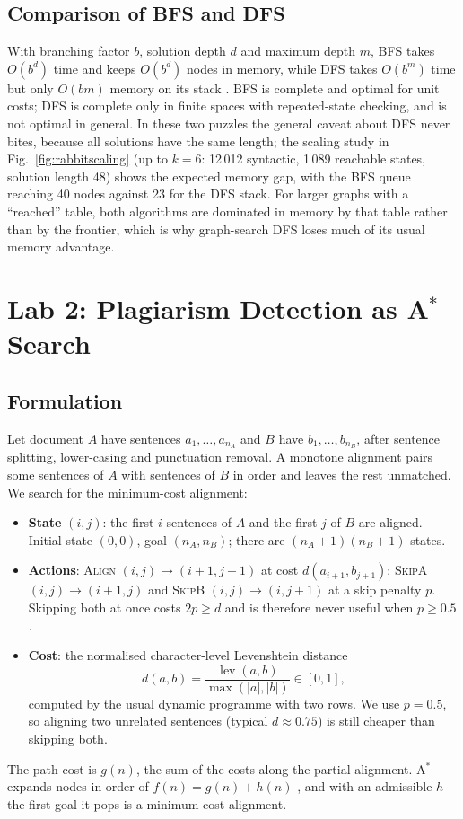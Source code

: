 \documentclass[journal]{IEEEtran}
\begin{document}
\subsection{Comparison of BFS and DFS}
With branching factor $b$, solution depth $d$ and maximum depth $m$, BFS takes
$O(b^d)$ time and keeps $O(b^d)$ nodes in memory, while DFS takes $O(b^m)$ time but only
$O(bm)$ memory on its stack \cite{aima4}. BFS is complete and optimal for unit costs; DFS
is complete only in finite spaces with repeated-state checking, and is not optimal in
general. In these two puzzles the general caveat about DFS never bites, because all
solutions have the same length; the scaling study in Fig.~\ref{fig:rabbitscaling} (up to
$k=6$: 12\,012 syntactic, 1\,089 reachable states, solution length 48) shows the expected
memory gap, with the BFS queue reaching 40 nodes against 23 for the DFS stack. For larger
graphs with a ``reached'' table, both algorithms are dominated in memory by that table
rather than by the frontier, which is why graph-search DFS loses much of its usual memory
advantage.

\section{Lab 2: Plagiarism Detection as A$^*$ Search}
\subsection{Formulation}
Let document $A$ have sentences $a_1,\dots,a_{n_A}$ and $B$ have $b_1,\dots,b_{n_B}$, after
sentence splitting, lower-casing and punctuation removal. A monotone alignment pairs some
sentences of $A$ with sentences of $B$ in order and leaves the rest unmatched. We search for
the minimum-cost alignment:
\begin{itemize}
\item \textbf{State} $(i,j)$: the first $i$ sentences of $A$ and the first $j$ of $B$ are
aligned. Initial state $(0,0)$, goal $(n_A,n_B)$; there are $(n_A+1)(n_B+1)$ states.
\item \textbf{Actions}: \textsc{Align} $(i,j)\to(i{+}1,j{+}1)$ at cost $d(a_{i+1},b_{j+1})$;
\textsc{SkipA} $(i,j)\to(i{+}1,j)$ and \textsc{SkipB} $(i,j)\to(i,j{+}1)$ at a skip penalty
$p$. Skipping both at once costs $2p \ge d$ and is therefore never useful when $p\ge 0.5$.
\item \textbf{Cost}: the normalised character-level Levenshtein distance \cite{levenshtein1966}
\begin{equation}
d(a,b) = \frac{\operatorname{lev}(a,b)}{\max(|a|,|b|)} \in [0,1],
\end{equation}
computed by the usual dynamic programme with two rows. We use $p=0.5$, so aligning two
unrelated sentences (typical $d\approx0.75$) is still cheaper than skipping both.
\end{itemize}
The path cost is $g(n)$, the sum of the costs along the partial alignment. A$^*$ expands
nodes in order of $f(n)=g(n)+h(n)$ \cite{hart1968}, and with an admissible $h$ the first goal
it pops is a minimum-cost alignment.
\end{document}
